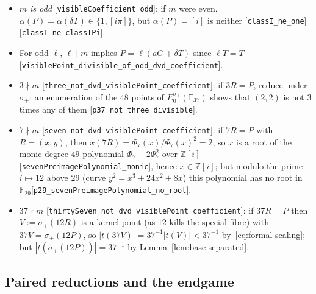 \documentclass[10pt]{article}
\theoremstyle{definition}
\theoremstyle{remark}
\newcommand{\Z}{\mathbb{Z}}
\newcommand{\F}{\mathbb{F}}
\newcommand{\pisym}{\pi}
\newcommand{\leanref}[1]{{\scriptsize\textup{[\texttt{#1}]}}\allowbreak}
\begin{document}
\begin{itemize}
\item \emph{$m$ is odd} \leanref{visible\allowbreak Coefficient\_\allowbreak odd}: if $m$ were even,
$\alpha(P)=\alpha(\delta T)\in\{1,[i\pisym]\}$, but $\alpha(P)=[i]$ is neither
\leanref{class\allowbreak I\_\allowbreak ne\_\allowbreak one} \leanref{class\allowbreak I\_\allowbreak ne\_\allowbreak class\allowbreak IPi}.
\item For odd $\ell$, $\ell\mid m$ implies $P=\ell(aG+\delta T)$ since $\ell T=T$
\leanref{visible\allowbreak Point\_\allowbreak divisible\_\allowbreak of\_\allowbreak odd\_\allowbreak dvd\_\allowbreak coefficient}.
\item \emph{$3\nmid m$} \leanref{three\_\allowbreak not\_\allowbreak dvd\_\allowbreak visible\allowbreak Point\_\allowbreak coefficient}: if
$3R=P$, reduce under $\sigma_+$; an enumeration of the $48$ points of
$E_0^{\sigma_+}(\F_{37})$ shows that $(2,2)$ is not $3$ times any of them
\leanref{p37\_\allowbreak not\_\allowbreak three\_\allowbreak divisible}.
\item \emph{$7\nmid m$} \leanref{seven\_\allowbreak not\_\allowbreak dvd\_\allowbreak visible\allowbreak Point\_\allowbreak coefficient}: if
$7R=P$ with $R=(x,y)$, then $x(7R)=\Phi_7(x)/\Psi_7(x)^2=2$, so $x$ is a root of
the monic degree-$49$ polynomial $\Phi_7-2\Psi_7^2$ over $\Z[i]$
\leanref{seven\allowbreak Preimage\allowbreak Polynomial\_\allowbreak monic}, hence $x\in\Z[i]$; but modulo the
prime $i\mapsto12$ above $29$ (curve $y^2=x^3+24x^2+8x$) this polynomial has no
root in $\F_{29}$\leanref{p29\_\allowbreak seven\allowbreak Preimage\allowbreak Polynomial\_\allowbreak no\_\allowbreak root}.
\item \emph{$37\nmid m$} \leanref{thirty\allowbreak Seven\_\allowbreak not\_\allowbreak dvd\_\allowbreak visible\allowbreak Point\_\allowbreak coefficient}:
if $37R=P$ then $V:=\sigma_+(12R)$ is a kernel point (as $12$ kills the special
fibre) with $37V=\sigma_+(12P)$, so $|t(37V)|=37^{-1}|t(V)|<37^{-1}$
by~\eqref{eq:formal-scaling}; but $|t(\sigma_+(12P))|=37^{-1}$ by
Lemma~\ref{lem:base-separated}.
\end{itemize}

\subsection{Paired reductions and the endgame}\label{sec:endgame}
\end{document}
